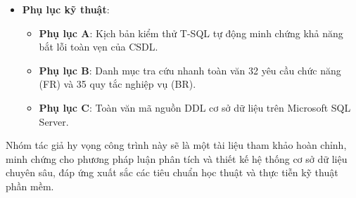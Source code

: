 \begin{itemize}
\begin{itemize}
    \end{itemize}
    \item \textbf{Phụ lục kỹ thuật}:
    \begin{itemize}
        \item \textbf{Phụ lục A}: Kịch bản kiểm thử T-SQL tự động minh chứng khả năng bắt lỗi toàn vẹn của CSDL.
        \item \textbf{Phụ lục B}: Danh mục tra cứu nhanh toàn văn 32 yêu cầu chức năng (FR) và 35 quy tắc nghiệp vụ (BR).
        \item \textbf{Phụ lục C}: Toàn văn mã nguồn DDL cơ sở dữ liệu trên Microsoft SQL Server.
    \end{itemize}
\end{itemize}

Nhóm tác giả hy vọng công trình này sẽ là một tài liệu tham khảo hoàn chỉnh, minh chứng cho phương pháp luận phân tích và thiết kế hệ thống cơ sở dữ liệu chuyên sâu, đáp ứng xuất sắc các tiêu chuẩn học thuật và thực tiễn kỹ thuật phần mềm.
